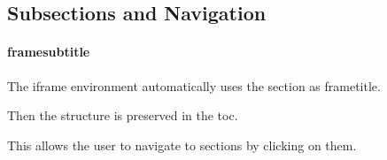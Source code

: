 \subsection{Subsections and Navigation}
\begin{iframe}
	\framesubtitle{framesubtitle}
	The iframe environment automatically uses the section as frametitle.

	Then the structure is preserved in the toc.
	
	This allows the user to navigate to sections by clicking on them.
\end{iframe}